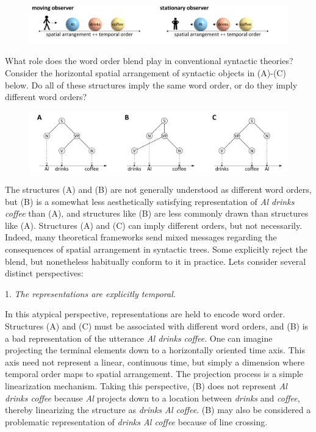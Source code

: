   
\begin{figure}
\includegraphics[width=\textwidth]{figures/Tilsen-img39.png}
\caption{\missingcaption}
\label{fig:}
\end{figure}
 

  What role does the word order blend play in conventional syntactic theories? Consider the horizontal spatial arrangement of syntactic objects in (A)-(C) below. Do all of these structures imply the same word order, or do they imply different word orders?

  
\begin{figure}
\includegraphics[width=\textwidth]{figures/Tilsen-img40.png}
\caption{\missingcaption}
\label{fig:}
\end{figure}
 

  The structures (A) and (B) are not generally understood as different word orders, but (B) is a somewhat less aesthetically satisfying representation of \textit{Al drinks coffee} than (A), and structures like (B) are less commonly drawn than structures like (A). Structures (A) and (C) can imply different orders, but not necessarily. Indeed, many theoretical frameworks send mixed messages regarding the consequences of spatial arrangement in syntactic trees. Some explicitly reject the blend, but nonetheless habitually conform to it in practice. Lets consider several distinct perspectives:

1. \textit{The representations are explicitly temporal.}

  In this atypical perspective, representations are held to encode word order. Structures (A) and (C) must be associated with different word orders, and (B) is a bad representation of the utterance \textit{Al drinks coffee}. One can imagine projecting the terminal elements down to a horizontally oriented time axis. This axis need not represent a linear, continuous time, but simply a dimension where temporal order maps to spatial arrangement. The projection process is a simple linearization mechanism. Taking this perspective, (B) does not represent \textit{Al drinks coffee} because \textit{Al} projects down to a location between \textit{drinks} and \textit{coffee}, thereby linearizing the structure as \textit{drinks Al coffee}. (B) may also be considered a problematic representation of \textit{drinks Al coffee} because of line crossing.


